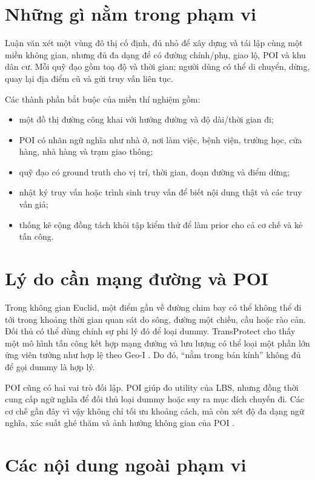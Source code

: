 \documentclass[12pt,a4paper,oneside]{report}
\begin{document}
\section{Những gì nằm trong phạm vi}

Luận văn xét một vùng đô thị cố định, đủ nhỏ để xây dựng và tái lập cùng một miền không gian, nhưng đủ đa dạng để có đường chính/phụ, giao lộ, POI và khu dân cư. Mỗi quỹ đạo gồm toạ độ và thời gian; người dùng có thể di chuyển, dừng, quay lại địa điểm cũ và gửi truy vấn liên tục.

Các thành phần bắt buộc của miền thí nghiệm gồm:

\begin{itemize}
  \item một đồ thị đường công khai với hướng đường và độ dài/thời gian đi;
  \item POI có nhãn ngữ nghĩa như nhà ở, nơi làm việc, bệnh viện, trường học, cửa hàng, nhà hàng và trạm giao thông;
  \item quỹ đạo có ground truth cho vị trí, thời gian, đoạn đường và điểm dừng;
  \item nhật ký truy vấn hoặc trình sinh truy vấn để biết nội dung thật và các truy vấn giả;
  \item thống kê cộng đồng tách khỏi tập kiểm thử để làm prior cho cả cơ chế và kẻ tấn công.
\end{itemize}

\section{Lý do cần mạng đường và POI}

Trong không gian Euclid, một điểm gần về đường chim bay có thể không thể đi tới trong khoảng thời gian quan sát do sông, đường một chiều, cầu hoặc rào cản. Đối thủ có thể dùng chính sự phi lý đó để loại dummy. TransProtect cho thấy một mô hình tấn công kết hợp mạng đường và lưu lượng có thể loại một phần lớn ứng viên tưởng như hợp lệ theo Geo-I \citep{yadav2024transprotect}. Do đó, ``nằm trong bán kính'' không đủ để gọi dummy là hợp lý.

POI cũng có hai vai trò đối lập. POI giúp đo utility của LBS, nhưng đồng thời cung cấp ngữ nghĩa để đối thủ loại dummy hoặc suy ra mục đích chuyến đi. Các cơ chế gần đây vì vậy không chỉ tối ưu khoảng cách, mà còn xét độ đa dạng ngữ nghĩa, xác suất ghé thăm và ảnh hưởng không gian của POI \citep{kuang2025lsppm,liu2026semantic}.

\section{Các nội dung ngoài phạm vi}
\end{document}
